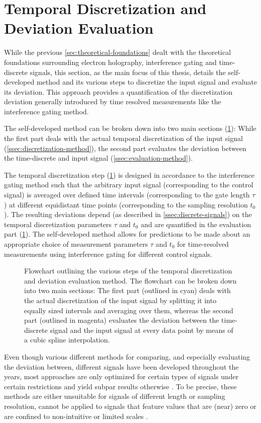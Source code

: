 \section{Temporal Discretization and Deviation Evaluation} \label{sec:implementation}
While the previous \cref{sec:theoretical-foundations} dealt with the theoretical foundations surrounding electron holography, interference gating and time-discrete signals, this section, as the main focus of this thesis, details the self-developed method and its various steps to discretize the input signal and evaluate its deviation. This approach provides a quantification of the discretization deviation generally introduced by time resolved measurements like the interference gating method.

The self-developed method can be broken down into two main sections (\cref{fig:flowchart}): While the first part deals with the actual temporal discretization of the input signal (\cref{ssec:discretization-method}), the second part evaluates the deviation between the time-discrete and input signal (\cref{ssec:evaluation-method}).

The temporal discretization step (\cref{fig:flowchart}) is designed in accordance to the interference gating method such that the arbitrary input signal (corresponding to the control signal) is averaged over defined time intervals (corresponding to the gate length $\tau$) at different equidistant time points (corresponding to the sampling resolution $t_0$). The resulting deviations depend (as described in \cref{ssec:discrete-signals}) on the temporal discretization parameters $\tau$ and $t_0$ and are quantified in the evaluation part (\cref{fig:flowchart}). The self-developed method allows for predictions to be made about an appropriate choice of measurement parameters $\tau$ and $t_0$ for time-resolved measurements using interference gating for different control signals.%
\begin{figure}[H]
	\centering
	\caption{Flowchart outlining the various steps of the temporal discretization and deviation evaluation method. The flowchart can be broken down into two main sections: The first part (outlined in cyan) deals with the actual discretization of the input signal by splitting it into equally sized intervals and averaging over them, whereas the second part (outlined in magenta) evaluates the deviation between the time-discrete signal and the input signal at every data point by means of a cubic spline interpolation.}
	\label{fig:flowchart}
\end{figure}
Even though various different methods for comparing, and especially evaluating the deviation between, different signals have been developed throughout the years, most approaches are only optimized for certain types of signals under certain restrictions and yield subpar results otherwise \cite{Bellman1959,Flores1986,Makridakis1993,Elmore2001,Hyndman2006,Kennedy2007,Kim2016}. To be precise, these methods are either unsuitable for signals of different length or sampling resolution, cannot be applied to signals that feature values that are (near) zero or are confined to non-intuitive or limited scales \cite{Bellman1959,Flores1986,Makridakis1993,Elmore2001,Hyndman2006,Kennedy2007,Kim2016}.

